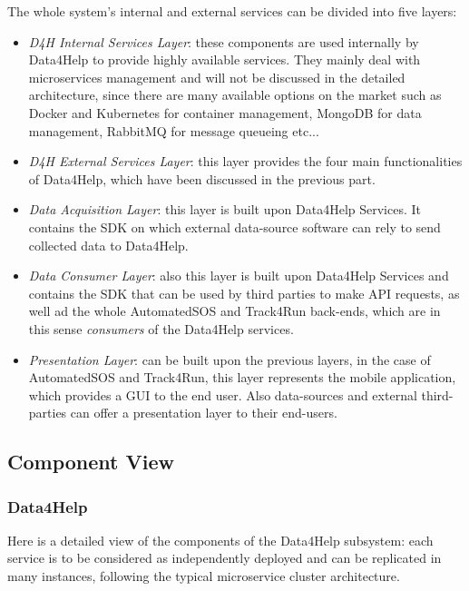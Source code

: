 The whole system's internal and external services can be divided into five layers:
\begin{itemize}
	\item \textit{D4H Internal Services Layer}: these components are used internally by Data4Help to provide highly available services. They mainly deal with microservices management and will not be discussed in the detailed architecture, since there are many available options on the market such as Docker and Kubernetes for container management, MongoDB for data management, RabbitMQ for message queueing etc...
	
	\item \textit{D4H External Services Layer}: this layer provides the four main functionalities of Data4Help, which have been discussed in the previous part.
	
	\item \textit{Data Acquisition Layer}: this layer is built upon Data4Help Services. It contains the SDK on which external data-source software can rely to send collected data to Data4Help.
	
	\item \textit{Data Consumer Layer}: also this layer is built upon Data4Help Services and contains the SDK that can be used by third parties to make API requests, as well ad the whole AutomatedSOS and Track4Run back-ends, which are in this sense \textit{consumers} of the Data4Help services.
	
	\item \textit{Presentation Layer}: can be built upon the previous layers, in the case of AutomatedSOS and Track4Run, this layer represents the mobile application, which provides a GUI to the end user. Also data-sources and external third-parties can offer a presentation layer to their end-users.
\end{itemize}


\subsection{Component View}


\subsubsection{Data4Help}

Here is a detailed view of the components of the Data4Help subsystem: each service is to be considered as independently deployed and can be replicated in many instances, following the typical microservice cluster architecture. 


